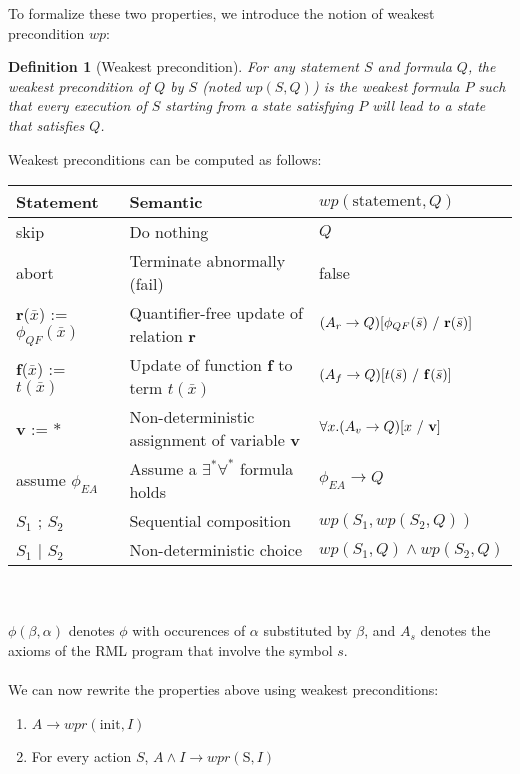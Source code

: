 \documentclass[11pt,a4paper,oldfontcommands]{memoir}
\newtheorem*{definition}{Definition}
\begin{document}
    To formalize these two properties, we introduce the notion of weakest precondition \(wp\):
    \begin{definition}[Weakest precondition]
        For any statement \(S\) and formula \(Q\), the weakest precondition of \(Q\) by \(S\) (noted \(wp(S,Q)\)) is the weakest formula \(P\) such that
        every execution of \(S\) starting from a state satisfying \(P\) will lead to a state that satisfies \(Q\).
    \end{definition}

    Weakest preconditions can be computed as follows:\\

    \begin{tabular}{|l|l|l|}
        \hline
        Statement & Semantic & \( wp(\text{statement},Q) \) \\
        \hline
        skip & Do nothing & \(Q\) \\
        abort & Terminate abnormally (fail) & false \\
        \textbf{r}(\(\bar{x}\)) := \( \phi_{QF}(\bar{x}) \) & Quantifier-free update of relation \textbf{r} & \((A_r \rightarrow Q) [\phi_{QF}(\bar{s})\ /\ \text{\textbf{r}}(\bar{s})]\) \\
        \textbf{f}(\(\bar{x}\)) := \( t(\bar{x}) \) & Update of function \textbf{f} to term \( t(\bar{x}) \) & \((A_f \rightarrow Q) [t(\bar{s})\ /\ \text{\textbf{f}}(\bar{s})]\) \\
        \textbf{v} := \( * \) & Non-deterministic assignment of variable \textbf{v} & \(\forall x. (A_v \rightarrow Q) [x\ /\ \text{\textbf{v}}]\)\\
        assume \( \phi_{EA} \) & Assume a \( \exists^*\forall^* \) formula holds & \( \phi_{EA} \rightarrow Q \) \\
        \( S_1 \) ; \( S_2 \) & Sequential composition & \( wp(S_1, wp(S_2, Q)) \) \\
        \( S_1 \) | \( S_2 \) & Non-deterministic choice & \( wp(S_1, Q) \land wp(S_2, Q) \) \\
        \hline
    \end{tabular}\\ \\
    \( \phi(\beta,\alpha) \) denotes \(\phi\) with occurences of \(\alpha\) substituted by \(\beta\), and \(A_s\) denotes the axioms of the RML program
    that involve the symbol \(s\).\\
    \\
    We can now rewrite the properties above using weakest preconditions:
    \begin{enumerate}
        \item \(A \rightarrow wpr(\text{init},I)\)
        \item For every action \(S\), \(A \land I \rightarrow wpr(\text{S},I)\)
    \end{enumerate}
\end{document}

